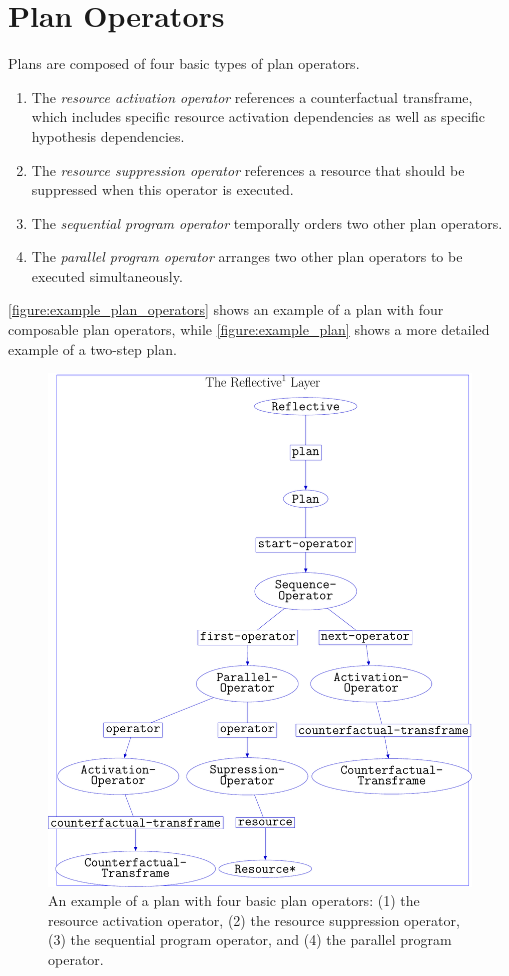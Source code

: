 \section{Plan Operators}

Plans are composed of four basic types of plan operators.
\begin{enumerate}
\item The \emph{resource activation operator} references a
  counterfactual transframe, which includes specific resource
  activation dependencies as well as specific hypothesis dependencies.
\item The \emph{resource suppression operator} references a resource
  that should be suppressed when this operator is executed.
\item The \emph{sequential program operator} temporally orders two
  other plan operators.
\item The \emph{parallel program operator} arranges two other plan
  operators to be executed simultaneously.
\end{enumerate}
{\mbox{\autoref{figure:example_plan_operators}}} shows an example of a
plan with four composable plan operators, while
{\mbox{\autoref{figure:example_plan}}} shows a more detailed example
of a two-step plan.
\begin{figure}
\centering
\includegraphics[width=12cm]{gfx/example_plan_operators}
\caption[An example of a plan with four composable plan operators.]{An
  example of a plan with four basic plan operators: (1) the resource
  activation operator, (2) the resource suppression operator, (3) the
  sequential program operator, and (4) the parallel program operator.}
\label{figure:example_plan_operators}
\end{figure}

